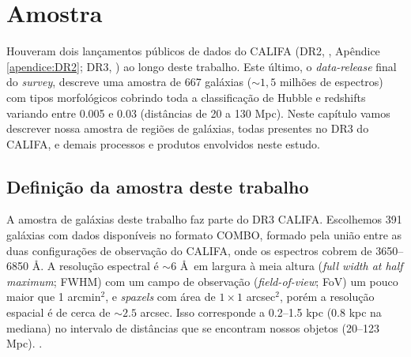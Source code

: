 


\chapter{Amostra}
\label{sec:sample}

Houveram dois lançamentos públicos de dados do CALIFA (DR2, \citealt{GarciaBenito.etal.2015a}, Apêndice \ref{apendice:DR2}; DR3, \citealt{SFSanchez.DR3.2016}) ao longo deste trabalho. Este último, o {\em data-release} final do {\em survey}, descreve uma amostra de 667 galáxias ($\sim 1,5$ milhões de espectros) com tipos morfológicos cobrindo toda a classificação de Hubble e redshifts variando entre 0.005 e 0.03 (distâncias de 20 a 130 Mpc). Neste capítulo vamos descrever nossa amostra de regiões de galáxias, todas presentes no DR3 do CALIFA, e demais processos e produtos envolvidos neste estudo.

\section{Definição da amostra deste trabalho}
\label{sec:sample:definicao}

A amostra de galáxias deste trabalho faz parte do DR3 CALIFA. Escolhemos 391 galáxias com dados disponíveis no formato COMBO, formado pela união entre as duas configurações de observação do CALIFA, onde os espectros cobrem de 3650--6850 \AA. A resolução espectral é $\sim 6$ \AA\ em largura à meia altura ({\em full width at half maximum}; FWHM) com um campo de observação ({\em field-of-view}; FoV) um pouco maior que 1 arcmin${}^2$, e {\em spaxels} com área de $1 \times 1$ arcsec$^2$, porém a resolução espacial é de cerca de $\sim 2.5$ arcsec. Isso corresponde a 0.2--1.5 kpc (0.8 kpc na mediana) no intervalo de distâncias que se encontram nossos objetos (20--123 Mpc). .


